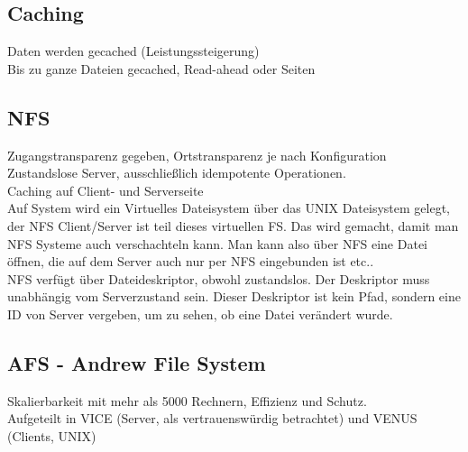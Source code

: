 \documentclass[a4paper]{article}
\begin{document}
\subsection{Caching}
Daten werden gecached (Leistungssteigerung)\\
Bis zu ganze Dateien gecached, Read-ahead oder Seiten\\
\subsection{NFS}
Zugangstransparenz gegeben, Ortstransparenz je nach Konfiguration\\
Zustandslose Server, ausschließlich idempotente Operationen.\\
Caching auf Client- und Serverseite\\
Auf System wird ein Virtuelles Dateisystem über das UNIX Dateisystem gelegt, der NFS Client/Server ist teil dieses virtuellen FS. Das wird gemacht, damit man NFS Systeme auch verschachteln kann. Man kann also über NFS eine Datei öffnen, die auf dem Server auch nur per NFS eingebunden ist etc..\\
NFS verfügt über Dateideskriptor, obwohl zustandslos. Der Deskriptor muss unabhängig vom Serverzustand sein. Dieser Deskriptor ist kein Pfad, sondern eine ID von Server vergeben, um zu sehen, ob eine Datei verändert wurde.
\subsection{AFS - Andrew File System}
Skalierbarkeit mit mehr als 5000 Rechnern, Effizienz und Schutz.\\
Aufgeteilt in VICE (Server, als vertrauenswürdig betrachtet) und VENUS (Clients, UNIX)\\
\end{document}
